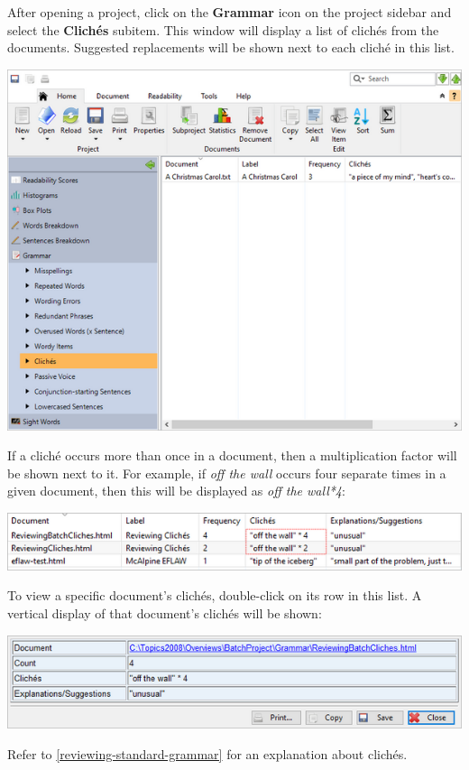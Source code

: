 \documentclass[
]{book}
\theoremstyle{definition}
\theoremstyle{definition}
\theoremstyle{definition}
\theoremstyle{definition}
\theoremstyle{remark}
\begin{document}
After opening a project, click on the \textbf{Grammar} icon on the project sidebar and select the \textbf{Clichés} subitem. This window will display a list of clichés from the documents. Suggested replacements will be shown next to each cliché in this list.

\includegraphics{Images/batchcliches.png}

If a cliché occurs more than once in a document, then a multiplication factor will be shown next to it. For example, if \emph{off the wall} occurs four separate times in a given document, then this will be displayed as \emph{off the wall*4}:

\includegraphics{Images/batchclichemultiple.png}

To view a specific document's clichés, double-click on its row in this list. A vertical display of that document's clichés will be shown:

\includegraphics{Images/batchclichesviewitem.png}

Refer to \ref{reviewing-standard-grammar} for an explanation about clichés.
\end{document}
